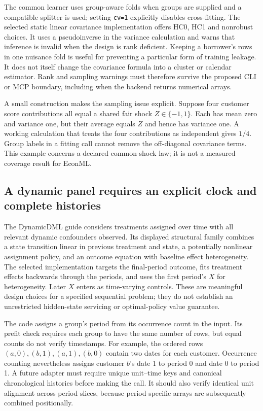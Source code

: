 The common learner uses group-aware folds when groups are supplied and a
compatible splitter is used; setting \texttt{cv=1} explicitly disables
cross-fitting. The selected static linear covariance implementation offers
HC0, HC1 and nonrobust choices. It uses a pseudoinverse in the variance
calculation and warns that inference is invalid when the design is rank
deficient. Keeping a borrower's rows in one nuisance fold is useful for
preventing a particular form of training leakage. It does not itself change
the covariance formula into a cluster or calendar estimator. Rank and
sampling warnings must therefore survive the proposed CLI or MCP boundary,
including when the backend returns numerical arrays.
\citep{exec19_econml_source}

A small construction makes the sampling issue explicit. Suppose four customer
score contributions all equal a shared fair shock $Z\in\{-1,1\}$. Each
has mean zero and variance one, but their average equals $Z$ and hence has
variance one. A working calculation that treats the four contributions as
independent gives $1/4$. Group labels in a fitting call cannot remove the
off-diagonal covariance terms. This example concerns a declared common-shock
law; it is not a measured coverage result for EconML.
\citep{exec19_econml_reference}

\subsection{A dynamic panel requires an explicit clock and complete histories}
\label{exec19:econml-panel}

The DynamicDML guide considers treatments assigned over time with all relevant
dynamic confounders observed. Its displayed structural family combines a
state transition linear in previous treatment and state, a potentially
nonlinear assignment policy, and an outcome equation with baseline effect
heterogeneity. The selected implementation targets the final-period outcome,
fits treatment effects backwards through the periods, and uses the first
period's $X$ for heterogeneity. Later $X$ enters as time-varying controls.
These are meaningful design choices for a specified sequential problem; they
do not establish an unrestricted hidden-state servicing or optimal-policy
value guarantee.~\citep{exec19_econml_source}

The code assigns a group's period from its occurrence count in the input.
Its prefit check requires each group to have the same number of rows, but
equal counts do not verify timestamps. For example, the ordered rows
$(a,0),(b,1),(a,1),(b,0)$ contain two dates for each customer. Occurrence
counting nevertheless assigns customer $b$'s date 1 to period 0 and date 0
to period 1. A future adapter must require unique unit--time keys and
canonical chronological histories before making the call. It should also
verify identical unit alignment across period slices, because period-specific
arrays are subsequently combined positionally.
\citep{exec19_econml_source,exec19_econml_reference}

